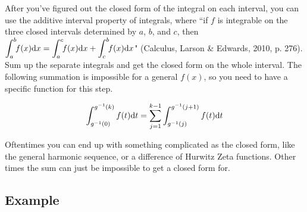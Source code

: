 \documentclass[12pt]{article}
\begin{document}
	\indent\indent After you've figured out the closed form of the integral on each interval, you
	can use the additive interval property of integrals, where ``if $f$ is integrable on the three
	closed intervals determined by $a$, $b$, and $c$, then $\displaystyle \int_a^b\!\!f(x)\text dx=
	\int_a^c\!\!f(x)\text dx+\int_c^b\!\!f(x)\text dx$" (Calculus, Larson \& Edwards, 2010, p.
	276). Sum up the separate integrals and get the closed form on the whole interval. The
	following summation is impossible for a general $f(x)$, so you need to have a specific
	function for this step.

	\begin{align*}
		\int_{g^{-1}(0)}^{g^{-1}(k)}f(t)\text dt=\sum_{j=1}^{k-1}\int_{g^{-1}(j)}^{g^{-1}(j+1)}
			f(t)\text dt
	\end{align*}

	\indent Oftentimes you can end up with something complicated as the closed form, like the
	general harmonic sequence, or a difference of Hurwitz Zeta functions. Other times the sum
	can just be impossible to get a closed form for.

	\subsection*{Example}
\end{document}
